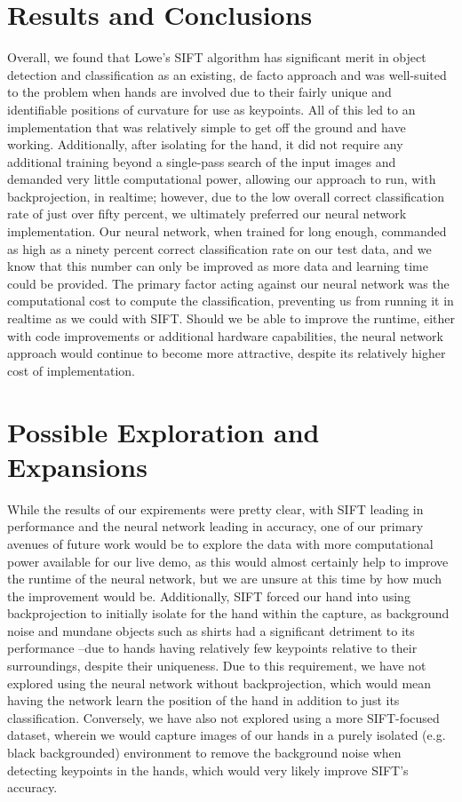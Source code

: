 \section{Results and Conclusions}

Overall, we found that Lowe's SIFT algorithm has significant merit in object detection and classification as an existing, de facto approach and was well-suited to the problem when hands are involved due to their fairly unique and identifiable positions of curvature for use as keypoints. All of this led to an implementation that was relatively simple to get off the ground and have working. Additionally, after isolating for the hand, it did not require any additional training beyond a single-pass search of the input images and demanded very little computational power, allowing our approach to run, with backprojection, in realtime; however, due to the low overall correct classification rate of just over fifty percent, we ultimately preferred our neural network implementation. Our neural network, when trained for long enough, commanded as high as a ninety percent correct classification rate on our test data, and we know that this number can only be improved as more data and learning time could be provided. The primary factor acting against our neural network was the computational cost to compute the classification, preventing us from running it in realtime as we could with SIFT. Should we be able to improve the runtime, either with code improvements or additional hardware capabilities, the neural network approach would continue to become more attractive, despite its relatively higher cost of implementation.

\section{Possible Exploration and Expansions}

While the results of our expirements were pretty clear, with SIFT leading in performance and the neural network leading in accuracy, one of our primary avenues of future work would be to explore the data with more computational power available for our live demo, as this would almost certainly help to improve the runtime of the neural network, but we are unsure at this time by how much the improvement would be. Additionally, SIFT forced our hand into using backprojection to initially isolate for the hand within the capture, as background noise and mundane objects such as shirts had a significant detriment to its performance --due to hands having relatively few keypoints relative to their surroundings, despite their uniqueness. Due to this requirement, we have not explored using the neural network without backprojection, which would mean having the network learn the position of the hand in addition to just its classification. Conversely, we have also not explored using a more SIFT-focused dataset, wherein we would capture images of our hands in a purely isolated (e.g. black backgrounded) environment to remove the background noise when detecting keypoints in the hands, which would very likely improve SIFT's accuracy.